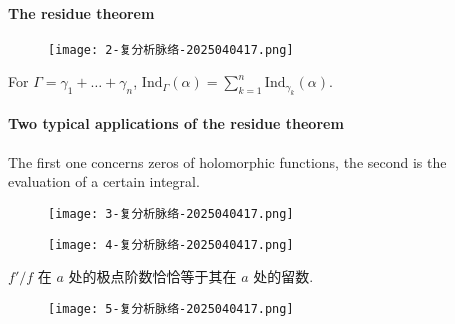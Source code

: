 \paragraph{The residue theorem}

\begin{figure}[H]
\centering
\texttt{[image: 2-复分析脉络-2025040417.png]}
\label{}
\end{figure}

For $\Gamma=\gamma_1+\dots+\gamma_n$, $\mathrm{Ind}_{\Gamma}(\alpha)=\sum_{k=1}^{n}\mathrm{Ind}_{\gamma _k}(\alpha)$.

\paragraph{Two typical applications of the residue theorem}

The first one concerns zeros of holomorphic functions, the second is the evaluation of a certain integral.

\begin{figure}[H]
\centering
\texttt{[image: 3-复分析脉络-2025040417.png]}
\label{}
\end{figure}

\begin{figure}[H]
\centering
\texttt{[image: 4-复分析脉络-2025040417.png]}
\label{}
\end{figure}

\begin{note}
$f'/f$ 在 $a$ 处的极点阶数恰恰等于其在 $a$ 处的留数.
\end{note}
\begin{figure}[H]
\centering
\texttt{[image: 5-复分析脉络-2025040417.png]}
\label{}
\end{figure}
